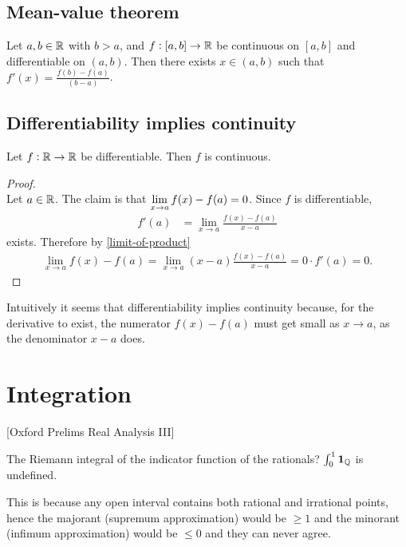\subsection{Mean-value theorem}
\begin{theorem*}
  Let $a, b \in \mathbb{R}$ with $b > a$, and $f:[a,b] \to \mathbb{R}$ be continuous on $[a, b]$ and differentiable
  on $(a, b)$. Then there exists $x \in (a, b)$ such that $f'(x) = \frac{f(b) - f(a)}{(b - a)}$.
\end{theorem*}


\subsection{Differentiability implies continuity}
\begin{theorem*}
  Let $f:\mathbb{R}\to\mathbb{R}$ be differentiable. Then $f$ is continuous.
\end{theorem*}

\begin{proof}~\\
  Let $a \in \mathbb{R}$. The claim is that $\limxa f(x) - f(a) = 0$. Since $f$ is differentiable,
  \begin{align*}
    f'(a) &= \lim_{x \to a} \frac{f(x) - f(a)}{x - a}
  \end{align*}
  exists. Therefore by \eqref{limit-of-product}
  \begin{align*}
    \lim_{x \to a} f(x) - f(a) = \lim_{x \to a} (x - a)\frac{f(x) - f(a)}{x - a} = 0\cdot f'(a) = 0.
  \end{align*}
\end{proof}

\begin{remark*}
  Intuitively it seems that differentiability implies continuity because, for the derivative to
  exist, the numerator $f(x) - f(a)$ must get small as $x\to a$, as the denominator $x - a$ does.
\end{remark*}


\newpage
\section{Integration}
[Oxford Prelims Real Analysis III]

The Riemann integral of the indicator function of the rationals? $\int_0^1 {\bf 1}_{\mathbb{Q}}$ is undefined.

This is because any open interval contains both rational and irrational points, hence the majorant (supremum
approximation) would be $\geq 1$ and the minorant (infimum approximation) would be $\leq 0$ and they can never
agree.

